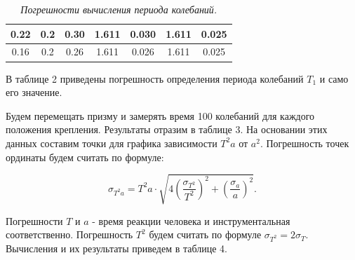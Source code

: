 \documentclass[a4paper,12pt]{report}
\begin{document}
\begin{table}[h!]
{\begin{tabular}{|c|c|c|c|c|c|c|}
0.22                                                                                                                                       & 0.2                                                                                               & 0.30                                                                                                            & 1.611                                                                             & 0.030                                                                                                      & 1.611                                                                     & 0.025                                                                                            \\ \hline
0.16                                                                                                                                       & 0.2                                                                                               & 0.26                                                                                                            & 1.611                                                                             & 0.026                                                                                                      & 1.611                                                                     & 0.025                                                                                            \\ \hline
\end{tabular}
}
\caption{\textit{Погрешности вычисления периода колебаний.}}
\end{table}

В таблице 2 приведены погрешность определения периода колебаний $T_1$ и само его значение.

Будем перемещать призму и замерять время 100 колебаний для каждого положения крепления. Результаты отразим в таблице 3. На основании этих данных составим точки для графика зависимости $T^2a$ от $a^2$. Погрешность точек ординаты будем считать по формуле:

\[ \sigma_{T^2a}=T^2a\cdot\sqrt{4(\frac{\sigma_{T^2}}{T^2})^2+(\frac{\sigma_a}{a})^2}. \]

Погрешности $T$ и $a$ - время реакции человека и инструментальная соответственно. Погрешность $T^2$ будем считать по формуле $\sigma_{T^2}=2\sigma_T $. Вычисления и их результаты приведем в таблице 4.
\end{document}
